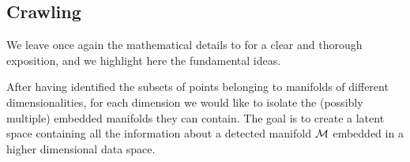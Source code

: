 \subsection{Crawling} \label{sec:Crawling}


We leave once again the mathematical details to \citet{Canducci2021} for a clear and thorough exposition, and we highlight here the fundamental ideas.

After having identified the subsets of points belonging to manifolds of different dimensionalities, for each dimension we would like to isolate the (possibly multiple) embedded manifolds they can contain.
The goal is to create a latent space containing all the information about a detected manifold $\mathcal{M}$ embedded in a higher dimensional data space.

